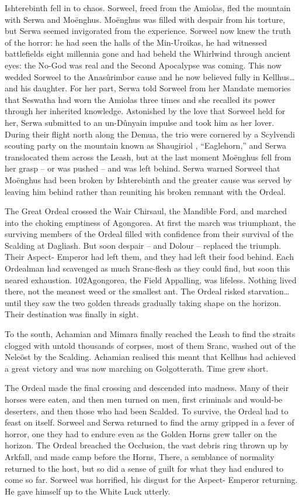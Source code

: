 \documentclass[]{book}
\begin{document}
Ishterebinth fell in to chaos. Sorweel, freed from the Amiolas, fled the mountain with
Serwa and Moënghus. Moënghus was filled with despair from his torture, but Serwa
seemed invigorated from the experience. Sorweel now knew the truth of the horror: he
had seen the halls of the Min-Uroikas, he had witnessed battlefields eight millennia
gone and had beheld the Whirlwind through ancient eyes: the No-God was real and
the Second Apocalypse was coming. This now wedded Sorweel to the Anasûrimbor
cause and he now believed fully in Kellhus\ldots{}and his daughter. For her part, Serwa told
Sorweel from her Mandate memories that Seswatha had worn the Amiolas three times
and she recalled its power through her inherited knowledge. Astonished by the love
that Sorweel held for her, Serwa submitted to an un-Dûnyain impulse and took him as
her lover. During their flight north along the Demua, the trio were cornered by a
Scylvendi scouting party on the mountain known as Shaugiriol , ``Eaglehorn,'' and
Serwa translocated them across the Leash, but at the last moment Moënghus fell from
her grasp -- or was pushed -- and was left behind. Serwa warned Sorweel that Moënghus
had been broken by Ishterebinth and the greater cause was served by leaving him
behind rather than reuniting his broken remnant with the Ordeal.

The Great Ordeal crossed the Wair Chirsaul, the Mandible Ford, and marched into the
choking emptiness of Agongorea. At first the march was triumphant, the surviving
members of the Ordeal filled with confidence from their survival of the Scalding at
Dagliash. But soon despair -- and Dolour -- replaced the triumph. Their Aspect-
Emperor had left them, and they had left their food behind. Each Ordealman had
scavenged as much Sranc-flesh as they could find, but soon this neared exhaustion.
102Agongorea, the Field Appalling, was lifeless. Nothing lived there, not the meanest weed
or the smallest ant. The Ordeal risked starvation\ldots{}until they saw the two golden threads
gradually taking shape on the horizon. Their destination was finally in sight.

To the south, Achamian and Mimara finally reached the Leash to find the straits
clogged with untold thousands of corpses, most of them Sranc, washed out of the
Neleöst by the Scalding. Achamian realised this meant that Kellhus had achieved a
great victory and was now marching on Golgotterath. Time grew short.

The Ordeal made the final crossing and descended into madness. Many of their horses
were eaten, and then men turned on men, first criminals and would-be deserters, and
then those who had been Scalded. To survive, the Ordeal had to feast on itself. Sorweel
and Serwa returned to find the army gripped in a fever of horror, one they had to
endure even as the Golden Horns grew taller on the horizon. The Ordeal breached the
Occlusion, the vast debris ring thrown up by Arkfall, and made camp before the Horns,
There, a semblance of normality returned to the host, but so did a sense of guilt for
what they had endured to come so far. Sorweel was horrified, his disgust for the Aspect-
Emperor returning. He gave himself up to the White Luck utterly.
\end{document}
